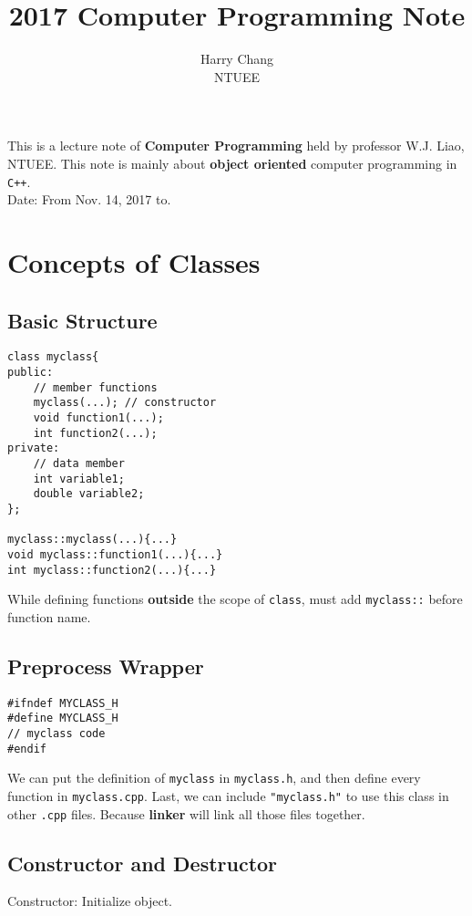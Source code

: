 \documentclass[12pt,a4paper]{article}
\title{2017 Computer Programming Note}
\author{Harry Chang\\NTUEE}
\date{}
\begin{document}
	\maketitle %
	This is a lecture note of \textbf{Computer Programming} held by professor W.J. Liao, NTUEE. This note is mainly about \textbf{object oriented} computer programming in \texttt{C++}.\\
	Date: From Nov. 14, 2017 to.
	\tableofcontents %
	\clearpage
	
	\section{Concepts of Classes}
		\subsection{Basic Structure}
			\begin{lstlisting}
class myclass{
public:
	// member functions
	myclass(...); // constructor
	void function1(...);
	int function2(...);
private:
	// data member
	int variable1;
	double variable2;
};

myclass::myclass(...){...}
void myclass::function1(...){...}
int myclass::function2(...){...}
\end{lstlisting}
			While defining functions \textbf{outside} the scope of \texttt{class}, must add \texttt{myclass::} before function name.
		
		\subsection{Preprocess Wrapper}
			\begin{lstlisting}
#ifndef MYCLASS_H
#define MYCLASS_H
// myclass code
#endif\end{lstlisting}
			We can put the definition of \texttt{myclass} in \texttt{myclass.h}, and then define every function in \texttt{myclass.cpp}. Last, we can include \texttt{"myclass.h"} to use this class in other \texttt{.cpp} files. Because \textbf{linker} will link all those files together.
		\subsection{Constructor and Destructor}
			Constructor: Initialize object.
			
\end{document}
